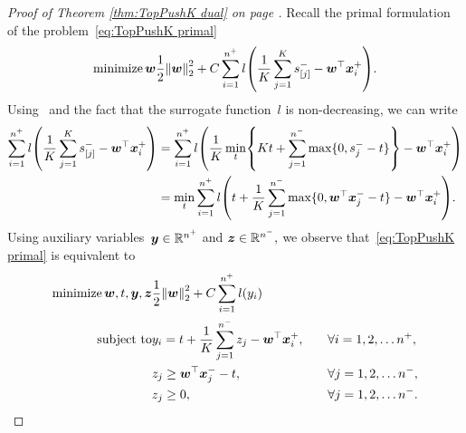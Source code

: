 \toppushkdual*
\begin{proof}[Proof of Theorem \ref{thm:TopPushK dual} on page \pageref{thm:TopPushK dual}]
  Recall the primal formulation of the \TopPushK problem~\eqref{eq:TopPushK primal}
  \begin{equation*}
    \minimize{\bm{w}} \frac{1}{2} \norm{\bm{w}}_{2}^{2} + C \sum_{i = 1}^{n^+} l\Brac{\frac{1}{K}\sum_{j = 1}^{K} s^{-}_{[j]} - \bm{w}^{\top}\bm{x}^+_{i}}.
  \end{equation*}
  Using~\cite[Lemma~1]{ogryczak2003minimizing} and the fact that the surrogate function~$l$ is non-decreasing, we can write
  \begin{align*}
    \sum_{i = 1}^{n^+} l\Brac{\frac{1}{K}\sum_{j = 1}^{K} s^{-}_{[j]} - \bm{w}^{\top}\bm{x}^+_{i}}
    & = \sum_{i = 1}^{n^+} l\Brac{ \frac{1}{K} \min_{t} \Brac[c]{Kt + \sum_{j = 1}^{n^-} \max\{0, s^-_j - t\}} - \bm{w}^{\top}\bm{x}^+_{i}} \\
    & = \min_{t} \sum_{i = 1}^{n^+} l\Brac{  t + \frac{1}{K} \sum_{j = 1}^{n^-} \max\{0, \bm{w}^{\top}\bm{x}^-_{j} - t\} - \bm{w}^{\top}\bm{x}^+_{i}}.
  \end{align*}
  Using auxiliary variables~$\bm y \in \mathbb{R}^{n^+}$ and $\bm{z} \in \mathbb{R}^{n^-},$ we observe that~\eqref{eq:TopPushK primal} is equivalent to
  \begin{alignat*}{2}
    \minimize{\bm{w}, t, \bm{y}, \bm{z}}
    & \frac{1}{2} \norm{\bm{w}}_{2}^{2}+ C \sum_{i = 1}^{n^+} l(y_i) \span \span \\
    \st
    & y_i = t + \frac{1}{K} \sum_{j = 1}^{n^-} z_j - \bm{w}^\top\bm{x}^+_i, & \quad & \forall i = 1, 2, \ldots n^+, \\
    & z_j \geq \bm{w}^\top\bm{x}^-_j - t, & \quad & \forall j = 1, 2, \ldots n^-, \\
    & z_j \geq 0, & \quad & \forall j = 1, 2, \ldots n^-.
  \end{alignat*}


\end{proof}
